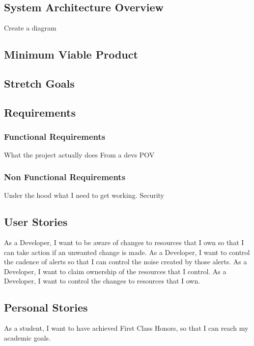 \documentclass{article}
\begin{document}
\subsection{System Architecture Overview}
Create a diagram


\subsection{Minimum Viable Product} \label{mvp}


\subsection{Stretch Goals} \label{stretch-g}



\subsection{Requirements}



\subsubsection{Functional Requirements}
What the project actually does
From a devs POV



\subsubsection{Non Functional Requirements}
Under the hood what I need to get working. Security




\subsection{User Stories}
As a Developer, I want to be aware of changes to resources that I own so that I can take action if an unwanted change is made.
As a Developer, I want to control the cadence of alerts so that I can control the noise created by those alerts.
As a Developer, I want to claim ownership of the resources that I control.
As a Developer, I want to control the changes to resources that I own.



\subsection{Personal Stories}
As a student, I want to have achieved First Class Honors, so that I can reach my academic goals.
\end{document}
